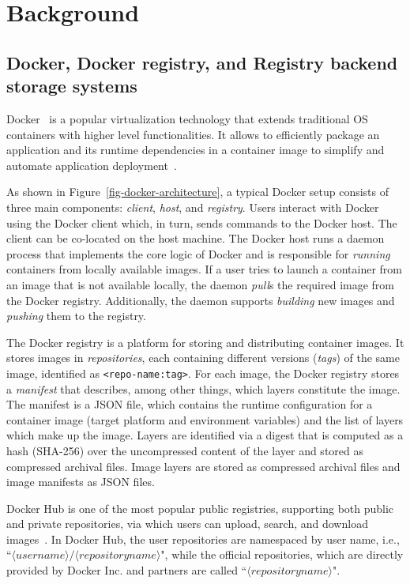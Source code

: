 \section{Background}
\label{sec:background}

\subsection{Docker, Docker registry, and Registry backend storage systems}
Docker~\cite{docker} is a popular virtualization technology that extends traditional OS containers with higher level functionalities.
It allows to efficiently package an application and its runtime dependencies in a container image to simplify and automate application deployment~\cite{slacker}.



As shown in Figure~\ref{fig-docker-architecture}, a typical Docker setup consists of three main components: \emph{client}, \emph{host}, and \emph{registry}.
Users interact with Docker using the Docker client which, in turn, sends commands to the Docker host.
The client can be co-located on the host machine. 
The Docker host runs a daemon process that implements the core logic of Docker and is responsible for \emph{running} containers from locally available images.
If a user tries to launch a container from an image that is not available locally, the daemon \emph{pull}s the required image from the Docker registry.
Additionally, the daemon supports \emph{building} new images and \emph{pushing} them to the registry.

The Docker registry is a platform for storing and distributing container images.
It stores images in \emph{repositories}, each containing different versions (\emph{tags}) of the same image, identified as \texttt{<repo-name:tag>}.
For each image, the Docker registry stores a \emph{manifest} that describes, among other things, which layers constitute the image.
The manifest is a JSON file, which contains the runtime configuration for a container image (\eg target platform and environment variables) 
and the list of layers which make up the image.
Layers are identified via a digest that is computed as a hash (SHA-256) over the uncompressed content of the layer and stored as compressed archival files.
Image layers are stored as compressed archival files and image manifests as JSON files.

Docker Hub is one of the most popular public registries, supporting both public and private repositories, via which users can upload, search, and
download images~\cite{docker-hub}.
In Docker Hub, the user repositories are namespaced by user name, i.e., ``$\langle username\rangle/\langle repository name \rangle$", while the
official repositories, which are directly provided by Docker Inc. and partners are called ``$\langle repository name \rangle$".

